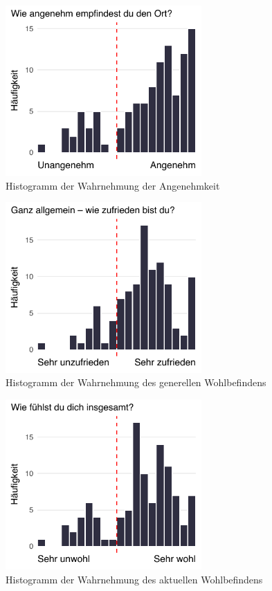 \begin{appendices}
\begin{figure}[ht]
    \centering
    \includegraphics[width=7.5cm]{Analyse/Plots/sliders/environmen_pleasure_hist.pdf}
    \caption{Histogramm der Wahrnehmung der Angenehmkeit}
    \label{fig:slider_hists_environmen_pleasure}
\end{figure}

\begin{figure}[ht]
    \centering
    \includegraphics[width=7.5cm]{Analyse/Plots/sliders/general_wellbeing_hist.pdf}
    \caption{Histogramm der Wahrnehmung des generellen Wohlbefindens}
    \label{fig:slider_hists_general_wellbeing}
\end{figure}

\begin{figure}[ht]
    \centering
    \includegraphics[width=7.5cm]{Analyse/Plots/sliders/content_hist.pdf}
    \caption{Histogramm der Wahrnehmung des aktuellen Wohlbefindens}
    \label{fig:slider_hists_content}
\end{figure}


\end{appendices}
